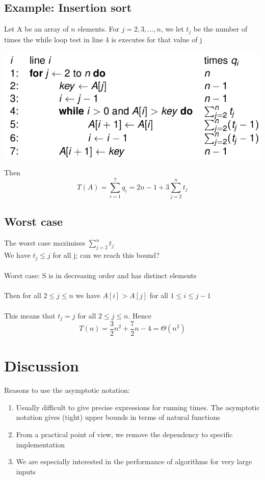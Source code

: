 \documentclass{article}[18pt]
\begin{document}
\subsection{Example: Insertion sort}
Let A be an array of $n$ elements. For $j= 2,3,..., n$, we let $t_j$ be the number of times the while loop test in line 4 is executes for that value of j
\begin{center}
	\includegraphics[scale=0.7]{Insertion-Sort}
\end{center}
Then
$$T(A)=\sum_{i=1}^{7} q_{i}=2 n-1+3 \sum_{j=2}^{n} t_{j}$$
\subsection{Worst case}
The worst case maximises $\sum_{j=2}^{n}t_j$\\
We have $t_j\leqslant j$ for all j; can we reach this bound?\\
\\
Worst case: S is in decreasing order and has distinct elements\\
\\
Then for all $2\leqslant j \leqslant n$ we have $A[i] > A[j]$ for all $1\leqslant i \leqslant j-1$\\
\\
This means that $t_j=j$ for all $2\leqslant j \leqslant n$. Hence
\[
T(n)=\frac{3}{2} n^{2}+\frac{7}{2} n-4=\Theta\left(n^{2}\right)
\]
\section{Discussion}
Reasons to use the asymptotic notation:
\begin{enumerate}
	\item Usually difficult to give precise expressions for running times. The asymptotic notation gives (tight) upper bounds in terms of natural functions
	\item From a practical point of view, we remove the dependency to specific implementation
	\item We are especially interested in the performance of algorithms for very large inputs
\end{enumerate}
\end{document}
